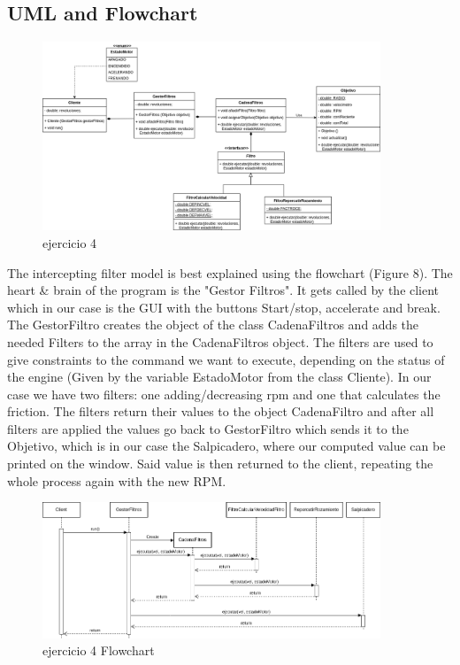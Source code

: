 \documentclass{article}
\begin{document}
\subsection{UML and Flowchart}
\begin{figure}[H]
	\centering
        \vspace{15pt}
	\includegraphics[width=0.9\textwidth]{Ej4.png}
	\caption{ejercicio 4}
	\label{fig:ej4}
\end{figure}

\item The intercepting filter model is best explained using the flowchart (Figure 8). The heart & brain of the program is the "Gestor Filtros". It gets called by the client which in our case is the GUI with the buttons Start/stop, accelerate and break. The GestorFiltro creates the object of the class CadenaFiltros and adds the needed Filters to the array in the CadenaFiltros object. The filters are used to give constraints to the command we want to execute, depending on the status of the engine (Given by the variable EstadoMotor from the class Cliente). In our case we have two filters: one adding/decreasing rpm and one that calculates the friction. The filters return their values to the object CadenaFiltro and after all filters are applied the values go back to GestorFiltro which sends it to the Objetivo, which is in our case the Salpicadero, where our computed value can be printed on the window. Said value is then returned to the client, repeating the whole process again with the new RPM.

\begin{figure}[H]
	\centering
        \vspace{15pt}
	\includegraphics[width=0.9\textwidth]{Flow_Ej4.png}
	\caption{ejercicio 4 Flowchart}
	\label{fig:ej4}
\end{figure}
\end{document}
